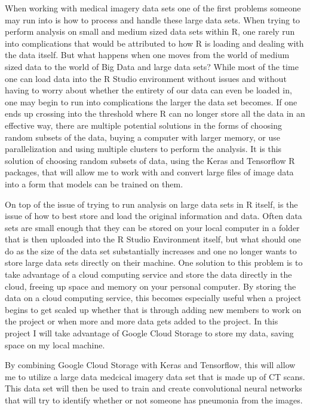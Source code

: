 \documentclass[12pt]{article}
\begin{document}
When working with medical imagery data sets one of the first problems
someone may run into is how to process and handle these large data sets.
When trying to perform analysis on small and medium sized data sets
within R, one rarely run into complications that would be attributed to
how R is loading and dealing with the data itself. But what happens when
one moves from the world of medium sized data to the world of Big Data
and large data sets? While most of the time one can load data into the R
Studio environment without issues and without having to worry about
whether the entirety of our data can even be loaded in, one may begin to
run into complications the larger the data set becomes. If one ends up
crossing into the threshold where R can no longer store all the data in
an effective way, there are multiple potential solutions in the forms of
choosing random subsets of the data, buying a computer with larger
memory, or use parallelization and using multiple clusters to perform
the analysis. It is this solution of choosing random subsets of data,
using the Keras and Tensorflow R packages, that will allow me to work
with and convert large files of image data into a form that models can
be trained on them.

On top of the issue of trying to run analysis on large data sets in R
itself, is the issue of how to best store and load the original
information and data. Often data sets are small enough that they can be
stored on your local computer in a folder that is then uploaded into the
R Studio Environment itself, but what should one do as the size of the
data set substantially increases and one no longer wants to store large
data sets directly on their machine. One solution to this problem is to
take advantage of a cloud computing service and store the data directly
in the cloud, freeing up space and memory on your personal computer. By
storing the data on a cloud computing service, this becomes especially
useful when a project begins to get scaled up whether that is through
adding new members to work on the project or when more and more data
gets added to the project. In this project I will take advantage of
Google Cloud Storage to store my data, saving space on my local machine.

By combining Google Cloud Storage with Keras and Tensorflow, this will
allow me to utilize a large data medcical imagery data set that is made
up of CT scans. This data set will then be used to train and create
convolutional neural networks that will try to identify whether or not
someone has pneumonia from the images.
\end{document}
